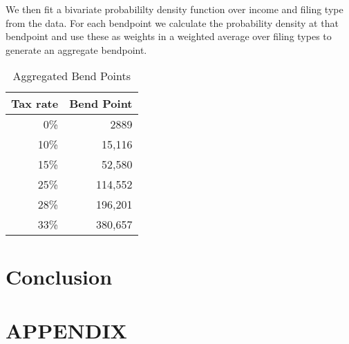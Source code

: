 \documentclass[letterpaper,12pt]{article}
\theoremstyle{definition}
\begin{document}
\begin{spacing}{1.5}
      We then fit a bivariate probabililty density function over income and filing type from the data.  For each bendpoint we calculate the probability density at that bendpoint and use these as weights in a weighted average over filing types to generate an aggregate bendpoint.
      \begin{table}[ht]
        \caption{Aggregated Bend Points}
        \label{Calib_Bend_Tab2}
        \centering
        \begin{tabular}{|r|r|} \hline 
          Tax rate & Bend Point \\ \hline 
          0\% & 2889 \\ \hline 
          10\% & 15,116 \\ \hline 
          15\% & 52,580 \\ \hline 
          25\% & 114,552 \\ \hline 
          28\% & 196,201 \\ \hline 
          33\% & 380,657 \\ \hline 
        \end{tabular}
      \end{table}

\section{Conclusion}\label{SecConclusion}


\end{spacing}

\newpage
\renewcommand{\theequation}{A.\arabic{section}.\arabic{equation}}
\renewcommand{\thesection}{A-\arabic{section}}   %
\setcounter{equation}{0}                         %
\setcounter{section}{0}                          %
\section*{APPENDIX}                              %



\newpage

\end{document}
